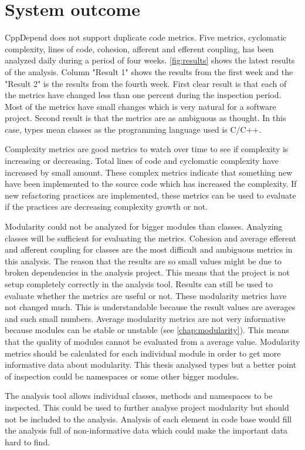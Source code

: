 \section{System outcome}
CppDepend does not support duplicate code metrics. Five metrics, cyclomatic complexity, lines of code, cohesion, afferent and efferent coupling, has been analyzed daily during a period of four weeks. \autoref{fig:results} shows the latest results of the analysis. Column "Result 1" shows the results from the first week and the "Result 2" is the results from the fourth week. First clear result is that each of the metrics have changed less than one percent during the inspection period. Most of the metrics have small changes which is very natural for a software project. Second result is that the metrics are as ambiguous as thought. In this case, types mean classes as the programming language used is C/C++. 

Complexity metrics are good metrics to watch over time to see if complexity is increasing or decreasing. Total lines of code and cyclomatic complexity have increased by small amount. These complex metrics indicate that something new have been implemented to the source code which has increased the complexity. If new refactoring practices are implemented, these metrics can be used to evaluate if the practices are decreasing complexity growth or not. 

Modularity could not be analyzed for bigger modules than classes. Analyzing classes will be sufficient for evaluating the metrics.
Cohesion and average efferent and afferent coupling for classes are the most difficult and ambiguous metrics in this analysis. The reason that the results are so small values might be due to broken dependencies in the analysis project. This means that the project is not setup completely correctly in the analysis tool. Results can still be used to evaluate whether the metrics are useful or not. These modularity metrics have not changed much. This is understandable because the result values are averages and such small numbers. Average modularity metrics are not very informative because modules can be stable or unstable (see \autoref{chap:modularity}). This means that the quality of modules cannot be evaluated from a average value. Modularity metrics should be calculated for each individual module in order to get more informative data about modularity. This thesis analysed types but a better point of inspection could be namespaces or some other bigger modules.

The analysis tool allows individual classes, methods and namespaces to be inspected. This could be used to further analyse project modularity but should not be included to the analysis. Analysis of each element in code base would fill the analysis full of non-informative data which could make the important data hard to find.

